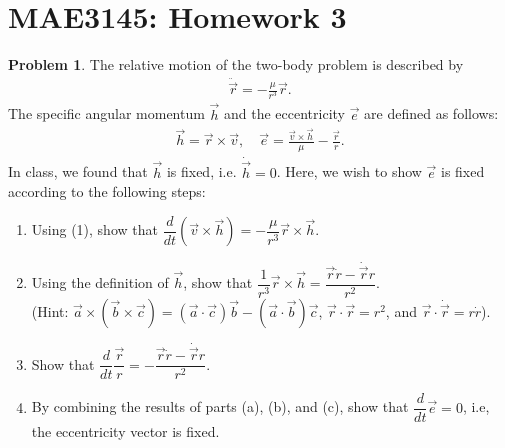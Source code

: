 \documentclass[10pt]{article}
\date{}
\theoremstyle{definition}
\newtheorem{prob}{Problem}[section]
\newenvironment{subprob}%
{\renewcommand{\theenumi}{\alph{enumi}}\renewcommand{\labelenumi}{(\theenumi)}\begin{enumerate}}%
{\end{enumerate}}%
\begin{document}
\setcounter{page}{1}
\pagestyle{plain}
\section*{MAE3145: Homework 3}
\vspace*{-0.4cm}


\begin{prob}
The relative motion of the two-body problem is described by
\begin{align}
\ddot{\vec r} = -\frac{\mu}{r^3}\vec r.
\end{align}
The specific angular momentum $\vec h$ and the eccentricity $\vec e$ are defined as follows:
\begin{align*}
\vec h = \vec r \times \vec v,\quad \vec e = \frac{\vec v\times\vec h}{\mu}- \frac{\vec r}{r}.
\end{align*}
In class, we found that $\vec h$ is fixed, i.e. $\dot{\vec h}=0$. Here, we wish to show $\vec e$ is fixed according to the following steps:
\begin{subprob}
\item Using (1), show that $\dfrac{d}{dt}(\vec v\times\vec h) = -\dfrac{\mu}{r^3} \vec r\times \vec h$.
\item Using the definition of $\vec h$, show that $\dfrac{1}{r^3}\vec r \times \vec h = \dfrac{\vec r \dot r - \dot{\vec r} r}{r^2}$.\\
(Hint: $\vec a\times (\vec b \times \vec c) = (\vec a \cdot \vec c)\vec b - (\vec a \cdot \vec b)\vec c$,\; $\vec r \cdot \vec r = r^2$, and $\vec r \cdot \dot{\vec r} = r\dot r$).
\item Show that $\dfrac{d}{dt}\dfrac{\vec r}{r} = -\dfrac{\vec r \dot r - \dot{\vec r} r}{r^2}$.
\item By combining the results of parts (a), (b), and (c), show that $\dfrac{d}{dt}\vec e=0$, i.e, the eccentricity vector is fixed.
\end{subprob}
\end{prob}
\end{document}
